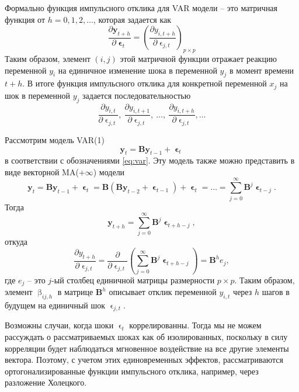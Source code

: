 \documentclass[a4paper, 14pt]{extreport}
\numberwithin{equation}{section}
\renewcommand{\beta}{\upbeta}
\renewcommand{\epsilon}{\upvarepsilon}
\numberwithin{equation}{section}
\begin{document}
	Формально функция импульсного отклика для VAR модели -- это матричная функция от $h=0,1,2,\ldots$, которая задается как
	\begin{equation}
		\dfrac{\partial \mathbf y_{t+h}}{\partial \mathbf \epsilon_t} = \left(\dfrac{\partial y_{i, t+h}}{\partial \epsilon_{j,t}}\right)_{p\times p}
	\end{equation}
	Таким образом, элемент $(i,j)$ этой матричной функции отражает реакцию переменной $y_i$ на единичное изменение шока в переменной $y_j$ в момент времени $t+h$. В итоге функция импульсного отклика для конкретной переменной $x_j$ на шок в переменной $y_j$ задается последовательностью
	\begin{equation}
		\dfrac{\partial y_{i,t}}{\partial \epsilon_{j,t}},\ \dfrac{\partial y_{i,t+1}}{\partial \epsilon_{j,t}},\ \ldots,\ \dfrac{\partial y_{i,t+h}}{\partial \epsilon_{j,t}}, \ldots
	\end{equation}
	
	Рассмотрим модель VAR(1)
	\begin{equation}
		\mathbf y_t = \mathbf B \mathbf y_{t-1} + \mathbf \epsilon_t
	\end{equation}
	в соответствии с обозначениями \eqref{eq:var}. Эту модель также можно представить в виде векторной MA($+\infty$) модели
	\begin{equation*}
		\mathbf y_t = \mathbf B \mathbf y_{t-1} + \mathbf \epsilon_t = \mathbf B (\mathbf B \mathbf y_{t-2} + \mathbf \epsilon_{t-1}) + \mathbf \epsilon_t = \ldots = \sum_{j=0}^{\infty} \mathbf B^j \mathbf \epsilon_{t-j}.
	\end{equation*}
	Тогда
	\begin{equation}\label{eq:vma}
		\mathbf y_{t+h} = \sum_{j=0}^{\infty} \mathbf B^j \mathbf \epsilon_{t+h-j},
	\end{equation}
	откуда
	\begin{equation}
		\dfrac{\partial y_{t+h}}{\partial \epsilon_{j,t}} = \dfrac{\partial}{\partial \epsilon_{j,t}} \left(\sum_{j=0}^{\infty} \mathbf B^j \mathbf \epsilon_{t+h-j}\right) = \mathbf B^h e_j,
	\end{equation}
	где $e_j$ -- это $j$-ый столбец единичной матрицы размерности $p\times p$.
	Таким образом, элемент $\beta_{ij, h}$ в матрице $\mathbf  B^h$ описывает отклик переменной $y_{i,t}$ через $h$ шагов в будущем на единичный шок $\epsilon_{j,t}$. 
	
	Возможны случаи, когда шоки $\epsilon_t$ коррелированны. Тогда мы не можем рассуждать о рассматриваемых шоках как об изолированных, поскольку в силу корреляции
	будет наблюдаться мгновенное воздействие на все другие элементы вектора. Поэтому, с учетом этих единовременных эффектов, рассматриваются ортогонализированные функции импульсного отклика, например, через разложение Холецкого.
	
\end{document}
